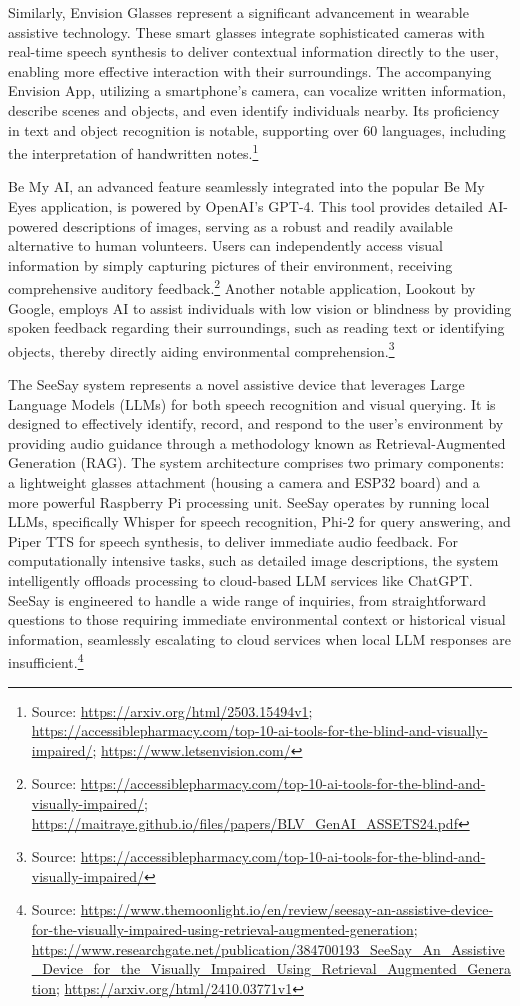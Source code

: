 Similarly, Envision Glasses represent a significant advancement in wearable assistive technology. These smart glasses integrate sophisticated cameras with real-time speech synthesis to deliver contextual information directly to the user, enabling more effective interaction with their surroundings. The accompanying Envision App, utilizing a smartphone's camera, can vocalize written information, describe scenes and objects, and even identify individuals nearby. Its proficiency in text and object recognition is notable, supporting over 60 languages, including the interpretation of handwritten notes.\footnote{Source: \url{https://arxiv.org/html/2503.15494v1}; \url{https://accessiblepharmacy.com/top-10-ai-tools-for-the-blind-and-visually-impaired/}; \url{https://www.letsenvision.com/}}

Be My AI, an advanced feature seamlessly integrated into the popular Be My Eyes application, is powered by OpenAI's GPT-4. This tool provides detailed AI-powered descriptions of images, serving as a robust and readily available alternative to human volunteers. Users can independently access visual information by simply capturing pictures of their environment, receiving comprehensive auditory feedback.\footnote{Source: \url{https://accessiblepharmacy.com/top-10-ai-tools-for-the-blind-and-visually-impaired/}; \url{https://maitraye.github.io/files/papers/BLV_GenAI_ASSETS24.pdf}} Another notable application, Lookout by Google, employs AI to assist individuals with low vision or blindness by providing spoken feedback regarding their surroundings, such as reading text or identifying objects, thereby directly aiding environmental comprehension.\footnote{Source: \url{https://accessiblepharmacy.com/top-10-ai-tools-for-the-blind-and-visually-impaired/}}

The SeeSay system represents a novel assistive device that leverages Large Language Models (LLMs) for both speech recognition and visual querying. It is designed to effectively identify, record, and respond to the user's environment by providing audio guidance through a methodology known as Retrieval-Augmented Generation (RAG). The system architecture comprises two primary components: a lightweight glasses attachment (housing a camera and ESP32 board) and a more powerful Raspberry Pi processing unit. SeeSay operates by running local LLMs, specifically Whisper for speech recognition, Phi-2 for query answering, and Piper TTS for speech synthesis, to deliver immediate audio feedback. For computationally intensive tasks, such as detailed image descriptions, the system intelligently offloads processing to cloud-based LLM services like ChatGPT. SeeSay is engineered to handle a wide range of inquiries, from straightforward questions to those requiring immediate environmental context or historical visual information, seamlessly escalating to cloud services when local LLM responses are insufficient.\footnote{Source: \url{https://www.themoonlight.io/en/review/seesay-an-assistive-device-for-the-visually-impaired-using-retrieval-augmented-generation}; \url{https://www.researchgate.net/publication/384700193_SeeSay_An_Assistive_Device_for_the_Visually_Impaired_Using_Retrieval_Augmented_Generation}; \url{https://arxiv.org/html/2410.03771v1}}

